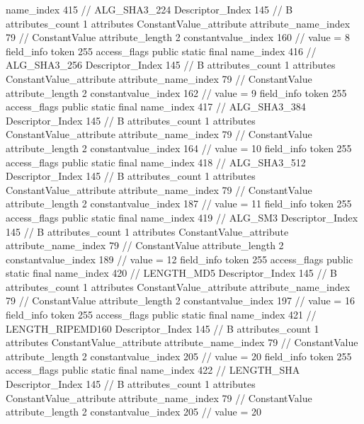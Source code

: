 {{{{{				name_index	415		// ALG_SHA3_224
				Descriptor_Index	145		// B
				attributes_count	1
				attributes {
				ConstantValue_attribute {
					attribute_name_index	79		// ConstantValue
					attribute_length	2
					constantvalue_index	160		// value = 8
				}
				}
			}
			field_info {
				token	255
				access_flags	public static final
				name_index	416		// ALG_SHA3_256
				Descriptor_Index	145		// B
				attributes_count	1
				attributes {
				ConstantValue_attribute {
					attribute_name_index	79		// ConstantValue
					attribute_length	2
					constantvalue_index	162		// value = 9
				}
				}
			}
			field_info {
				token	255
				access_flags	public static final
				name_index	417		// ALG_SHA3_384
				Descriptor_Index	145		// B
				attributes_count	1
				attributes {
				ConstantValue_attribute {
					attribute_name_index	79		// ConstantValue
					attribute_length	2
					constantvalue_index	164		// value = 10
				}
				}
			}
			field_info {
				token	255
				access_flags	public static final
				name_index	418		// ALG_SHA3_512
				Descriptor_Index	145		// B
				attributes_count	1
				attributes {
				ConstantValue_attribute {
					attribute_name_index	79		// ConstantValue
					attribute_length	2
					constantvalue_index	187		// value = 11
				}
				}
			}
			field_info {
				token	255
				access_flags	public static final
				name_index	419		// ALG_SM3
				Descriptor_Index	145		// B
				attributes_count	1
				attributes {
				ConstantValue_attribute {
					attribute_name_index	79		// ConstantValue
					attribute_length	2
					constantvalue_index	189		// value = 12
				}
				}
			}
			field_info {
				token	255
				access_flags	public static final
				name_index	420		// LENGTH_MD5
				Descriptor_Index	145		// B
				attributes_count	1
				attributes {
				ConstantValue_attribute {
					attribute_name_index	79		// ConstantValue
					attribute_length	2
					constantvalue_index	197		// value = 16
				}
				}
			}
			field_info {
				token	255
				access_flags	public static final
				name_index	421		// LENGTH_RIPEMD160
				Descriptor_Index	145		// B
				attributes_count	1
				attributes {
				ConstantValue_attribute {
					attribute_name_index	79		// ConstantValue
					attribute_length	2
					constantvalue_index	205		// value = 20
				}
				}
			}
			field_info {
				token	255
				access_flags	public static final
				name_index	422		// LENGTH_SHA
				Descriptor_Index	145		// B
				attributes_count	1
				attributes {
				ConstantValue_attribute {
					attribute_name_index	79		// ConstantValue
					attribute_length	2
					constantvalue_index	205		// value = 20
				}
}}}}}}
